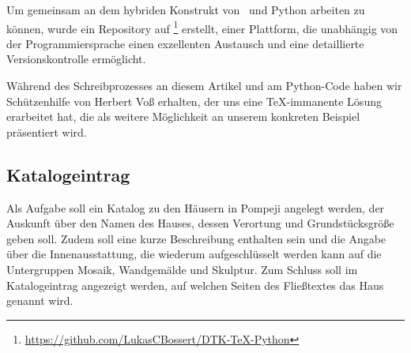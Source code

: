 \documentclass[ngerman]{dtk}
\begin{document}
Um gemeinsam an dem hybriden Konstrukt von \XeLaTeX\ und Python arbeiten zu können, wurde ein Repository auf \footnote{\url{https://github.com/LukasCBossert/DTK-TeX-Python}} erstellt, einer Plattform,  
die unabhängig von der Programmiersprache einen exzellenten Austausch und eine detaillierte Versionskontrolle ermöglicht.

Während des Schreibprozesses an diesem Artikel und am Python-Code haben wir Schützenhilfe von Herbert Voß erhalten, 
der uns eine \TeX -immanente Lösung erarbeitet hat, 
die  als weitere Möglichkeit an unserem konkreten Beispiel präsentiert wird.

\subsection{Katalogeintrag}
Als Aufgabe soll ein Katalog zu den Häusern in Pompeji angelegt werden,
der Auskunft über den Namen des Hauses, dessen Verortung und Grundstücksgröße  geben soll.
Zudem soll eine kurze Beschreibung enthalten sein und die Angabe über die Innenausstattung, 
die wiederum aufgeschlüsselt werden kann auf die Untergruppen Mosaik, Wandgemälde und Skulptur. 
Zum Schluss soll im Katalogeintrag angezeigt werden, 
auf welchen Seiten des Fließtextes das Haus genannt wird.
\end{document}
